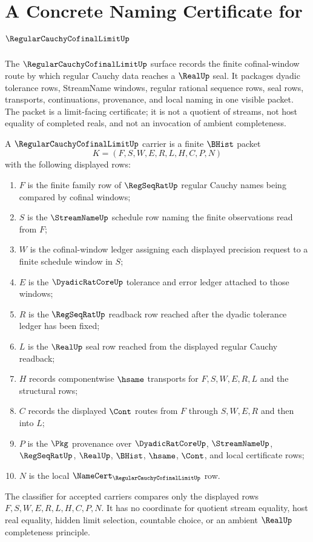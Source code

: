 \chapter{A Concrete Naming Certificate for $\RegularCauchyCofinalLimitUp$}
\label{ch:concrete-instances-regularcauchycofinallimit-namecert}

The $\RegularCauchyCofinalLimitUp$ surface records the finite cofinal-window route by which regular Cauchy data reaches a $\RealUp$ seal. It packages dyadic tolerance rows, StreamName windows, regular rational sequence rows, seal rows, transports, continuations, provenance, and local naming in one visible packet. The packet is a limit-facing certificate; it is not a quotient of streams, not host equality of completed reals, and not an invocation of ambient completeness.

\begin{definition}
\label{def:regular-cauchy-cofinal-limit-carrier}
A $\RegularCauchyCofinalLimitUp$ carrier is a finite $\BHist$ packet
$$
K=(F,S,W,E,R,L,H,C,P,N)
$$
with the following displayed rows:
\begin{enumerate}
\item $F$ is the finite family row of $\RegSeqRatUp$ regular Cauchy names being compared by cofinal windows;
\item $S$ is the $\StreamNameUp$ schedule row naming the finite observations read from $F$;
\item $W$ is the cofinal-window ledger assigning each displayed precision request to a finite schedule window in $S$;
\item $E$ is the $\DyadicRatCoreUp$ tolerance and error ledger attached to those windows;
\item $R$ is the $\RegSeqRatUp$ readback row reached after the dyadic tolerance ledger has been fixed;
\item $L$ is the $\RealUp$ seal row reached from the displayed regular Cauchy readback;
\item $H$ records componentwise $\hsame$ transports for $F,S,W,E,R,L$ and the structural rows;
\item $C$ records the displayed $\Cont$ routes from $F$ through $S,W,E,R$ and then into $L$;
\item $P$ is the $\Pkg$ provenance over $\DyadicRatCoreUp$, $\StreamNameUp$, $\RegSeqRatUp$, $\RealUp$, $\BHist$, $\hsame$, $\Cont$, and local certificate rows;
\item $N$ is the local $\NameCert_{\RegularCauchyCofinalLimitUp}$ row.
\end{enumerate}
The classifier for accepted carriers compares only the displayed rows $F,S,W,E,R,L,H,C,P,N$. It has no coordinate for quotient stream equality, host real equality, hidden limit selection, countable choice, or an ambient $\RealUp$ completeness principle.
\end{definition}

